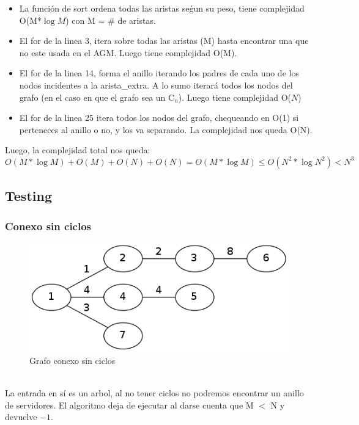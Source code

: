 \begin{itemize}
\item La funci\'on de sort ordena todas las aristas se\'gun su peso, tiene complejidad O(M*$\log{M}$) con M = \# de aristas.
\item El for de la linea 3, itera sobre todas las aristas (M) hasta encontrar una que no este usada en el AGM. Luego tiene complejidad O(M).
\item El for de la linea 14, forma el anillo iterando los padres de cada uno de los nodos incidentes a la arista\_extra. A lo sumo iterar\'a  todos los nodos del grafo (en el caso en que el grafo sea un C$_n$). Luego tiene complejidad O($N$)
\item El for de la linea 25 itera todos los nodos del grafo, chequeando en O(1) si perteneces al anillo o no, y los va separando. La complejidad nos queda O(N).
\end{itemize}
\newpage
Luego, la complejidad total nos queda:
$$O(M*\log{M})+O(M)+O(N)+O(N) = O(M*\log{M}) \leq O(N^2*\log{N^2}) < N^3$$




\subsection{Testing}

\subsubsection{Conexo sin ciclos}

\begin{figure}[h]
  \centering
    \includegraphics[scale=0.45]{ej3/caso0-1.png}
  \caption{Grafo conexo sin ciclos}
  \label{fig:ejemplo}
\end{figure}
~
\\
La entrada en s\'i es un arbol, al no tener ciclos no podremos encontrar un anillo de servidores.
El algoritmo deja de ejecutar al darse cuenta que M $<$ N y devuelve $-1$.


